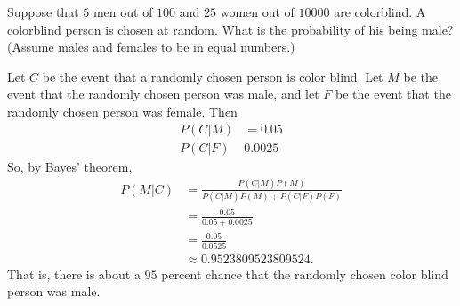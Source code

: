 \begin{problem}[Handout 4, \# 9]
  Suppose that \(5\) men out of \(100\) and \(25\) women out of
  \(\num{10000}\) are colorblind. A colorblind person is chosen at
  random. What is the probability of his being male? (Assume males and
  females to be in equal numbers.)
\end{problem}
\begin{solution}
  Let $C$ be the event that a randomly chosen person is
  color blind. Let $M$ be the event that the randomly chosen person was
  male, and let $F$ be the event that the randomly chosen person was
  female. Then
  \begin{align*}
    P(C|M)&=0.05\\
    P(C|F)& 0.0025
  \end{align*}
  So, by Bayes' theorem,
  \begin{align*}
    P(M|C)
    &=\frac{P(C|M)P(M)}{P(C|M)P(M)+P(C|F)P(F)}\\
    &=\frac{0.05}{0.05+0.0025}\\
    &=\frac{0.05}{0.0525}\\
    &\approx\num{0.9523809523809524}.
  \end{align*}
  That is, there is about a \(95\) percent chance that the randomly chosen
  color blind person was male.
\end{solution}
\newpage


